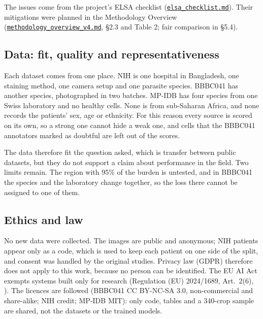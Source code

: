 \documentclass[11pt,a4paper]{article}
\begin{document}
The issues come from the project's ELSA checklist (\href{https://gitlab.uvt.nl/capstone/2026-fall/u927271/-/blob/main/docs/elsa_checklist.md}{\texttt{elsa\_\allowbreak{}checklist.\allowbreak{}md}}). Their mitigations were planned in the Methodology Overview (\href{https://gitlab.uvt.nl/capstone/2026-fall/u927271/-/blob/main/docs/methodology_overview_v4.md}{\texttt{methodology\_\allowbreak{}overview\_\allowbreak{}v4.\allowbreak{}md}}, \S{}2.3 and Table 2; fair comparison in \S{}5.4).

\subsection{Data: fit, quality and representativeness}

Each dataset comes from one place. NIH is one hospital in Bangladesh, one staining method, one camera setup and one parasite species. BBBC041 has another species, photographed in two batches. MP-IDB has four species from one Swiss laboratory and no healthy cells. None is from sub-Saharan Africa, and none records the patients' sex, age or ethnicity. For this reason every source is scored on its own, so a strong one cannot hide a weak one, and cells that the BBBC041 annotators marked as doubtful are left out of the scores.

The data therefore fit the question asked, which is transfer between public datasets, but they do not support a claim about performance in the field. Two limits remain. The region with 95\% of the burden is untested, and in BBBC041 the species and the laboratory change together, so the loss there cannot be assigned to one of them.

\subsection{Ethics and law}

No new data were collected. The images are public and anonymous; NIH patients appear only as a code, which is used to keep each patient on one side of the split, and consent was handled by the original studies. Privacy law (GDPR) therefore does not apply to this work, because no person can be identified. The EU AI Act exempts systems built only for research (Regulation (EU) 2024/1689, Art.~2(6), \citealp{aiact2024}). The licences are followed (BBBC041 CC BY-NC-SA 3.0, non-commercial and share-alike; NIH credit; MP-IDB MIT): only code, tables and a 340-crop sample are shared, not the datasets or the trained models.
\end{document}
